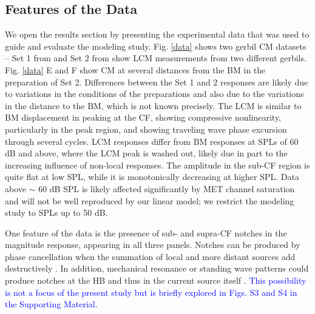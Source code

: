 \documentclass{biophys-new}
\begin{document}
\subsection{Features of the Data}
\par{We open the results section by presenting the experimental data that was used to guide and evaluate the modeling study.  Fig. \ref{data} shows two gerbil CM datasets -- Set 1 from \cite{fallah} and Set 2 from \cite{nankaliwang} show LCM measurements from two different gerbils. Fig. \ref{data} E and F show CM at several distances from the BM in the preparation of Set 2. Differences between the Set 1 and 2 responses are likely due to variations in the conditions of the preparations and also due to the variations in the distance to the BM, which is not known precisely.  The LCM is similar to BM displacement in peaking at the CF, showing compressive nonlinearity, particularly in the peak region, and showing traveling wave phase excursion through several cycles. LCM responses differ from BM responses at SPLs of 60 dB and above, where the LCM peak is washed out, likely due in part to the increasing influence of non-local responses. The amplitude in the sub-CF region is quite flat at low SPL, while it is monotonically decreasing at higher SPL. Data above $\sim$ 60 dB SPL is likely affected significantly by MET channel saturation and will not be well reproduced by our linear model; we restrict the modeling study to SPLs up to 50 dB.}
\par{One feature of the data is the presence of sub- and supra-CF notches in the magnitude response, appearing in all three panels. Notches can be produced by phase cancellation when the summation of local and more distant sources add destructively \cite{patuzzi,dongolson}. In addition, mechanical resonance or standing wave patterns could produce notches at the HB and thus in the current source itself \cite{nankaliwang,coopershera}. \textcolor{blue}{This possibility is not a focus of the present study but is briefly explored in Figs. S3 and S4 in the Supporting Material.}}
\end{document}
